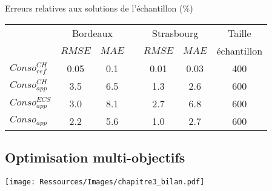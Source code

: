 \documentclass[xcolor=x11names, compress, 11pt]{beamer}
\begin{document}
\begin{frame}[c]
    \vfill
    \begin{table}
    \centering
    Erreurs relatives aux solutions de l’échantillon (\si{\percent})
    \vfill
    \begin{tabular}{l c c c c c c}
        \toprule
                        & \multicolumn{2}{c}{Bordeaux} & & \multicolumn{2}{c}{Strasbourg} &
                          Taille \\
                        \cmidrule(r){2-3}
                        \cmidrule(r){5-6}
                        & $RMSE$ & $MAE$   &       & $RMSE$ & $MAE$ & échantillon \\
        \midrule
        $Conso_{ref}^{CH}$  & \num{0.05}  & \num{0.1}  &  & \num{0.01}   & \num{0.03}  & \num{400}  \\
        \addlinespace[\defaultaddspace]
        $Conso_{app}^{CH}$  & \num{3.5}  & \num{6.5} &  & \num{1.3}   & \num{2.6}  & \num{600} \\
        \addlinespace[\defaultaddspace]
        $Conso_{app}^{ECS}$ & \num{3.0} & \num{8.1} & & \num{2.7}   & \num{6.8}  & \num{600} \\
        \addlinespace[\defaultaddspace]
        $Conso_{app}$       & \num{2.2} & \num{5.6} & & \num{1.0}   & \num{2.7}  & \num{600} \\
        \bottomrule
    \end{tabular}
    \end{table}
    \vfill
    \vfill
\end{frame}



\subsection{Optimisation multi-objectifs}
\begin{frame}[t]
    \vfill
    \centering
    \texttt{[image: Ressources/Images/chapitre3\_bilan.pdf]}
    \vfill
\end{frame}
\end{document}

